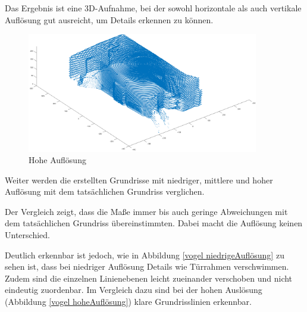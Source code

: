 Das Ergebnis ist eine 3D-Aufnahme, bei der sowohl horizontale als auch vertikale Auflösung gut ausreicht, um Details erkennen zu können.

\begin{figure}[H]
	\centering
	\includegraphics[width=0.9\textwidth]{images/Validierung/Aufloesungen/hoch.png}
	\caption{Hohe Auflösung}
	\label{hoch}
\end{figure}


Weiter werden die erstellten Grundrisse mit niedriger, mittlere und hoher Auflösung mit dem tatsächlichen Grundriss verglichen.

Der Vergleich zeigt, dass die Maße immer bis auch geringe Abweichungen mit dem tatsächlichen Grundriss übereinstimmten. Dabei macht die Auflösung keinen Unterschied. 

Deutlich erkennbar ist jedoch, wie in Abbildung \ref{vogel niedrigeAuflösung} zu sehen ist, dass bei niedriger Auflösung Details wie Türrahmen verschwimmen. Zudem sind die einzelnen Linienebenen leicht zueinander verschoben und nicht eindeutig zuordenbar.
Im Vergleich dazu sind bei der hohen Auslösung (Abbildung \ref{vogel hoheAuflösung}) klare Grundrisslinien erkennbar.

